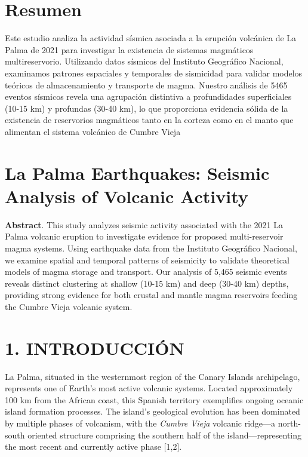 \documentclass[
  spanish,
  letterpaper,
]{book}
\begin{document}
\label{resumen}

\chapter{Resumen}\label{resumen}

Este estudio analiza la actividad sísmica asociada a la erupción
volcánica de La Palma de 2021 para investigar la existencia de sistemas
magmáticos multireservorio. Utilizando datos sísmicos del Instituto
Geográfico Nacional, examinamos patrones espaciales y temporales de
sismicidad para validar modelos teóricos de almacenamiento y transporte
de magma. Nuestro análisis de 5465 eventos sísmicos revela una
agrupación distintiva a profundidades superficiales (10-15 km) y
profundas (30-40 km), lo que proporciona evidencia sólida de la
existencia de reservorios magmáticos tanto en la corteza como en el
manto que alimentan el sistema volcánico de Cumbre Vieja

\label{abstract}

\chapter{La Palma Earthquakes: Seismic Analysis of Volcanic
Activity}\label{la-palma-earthquakes-seismic-analysis-of-volcanic-activity}

\textbf{Abstract}. This study analyzes seismic activity associated with
the 2021 La Palma volcanic eruption to investigate evidence for proposed
multi-reservoir magma systems. Using earthquake data from the Instituto
Geográfico Nacional, we examine spatial and temporal patterns of
seismicity to validate theoretical models of magma storage and
transport. Our analysis of 5,465 seismic events reveals distinct
clustering at shallow (10-15 km) and deep (30-40 km) depths, providing
strong evidence for both crustal and mantle magma reservoirs feeding the
Cumbre Vieja volcanic system.


\chapter{1. INTRODUCCIÓN}\label{introducciuxf3n}

La Palma, situated in the westernmost region of the Canary Islands
archipelago, represents one of Earth's most active volcanic systems.
Located approximately 100 km from the African coast, this Spanish
territory exemplifies ongoing oceanic island formation processes. The
island's geological evolution has been dominated by multiple phases of
volcanism, with the \emph{Cumbre Vieja} volcanic ridge---a north-south
oriented structure comprising the southern half of the
island---representing the most recent and currently active phase
{[}1,2{]}.
\end{document}
